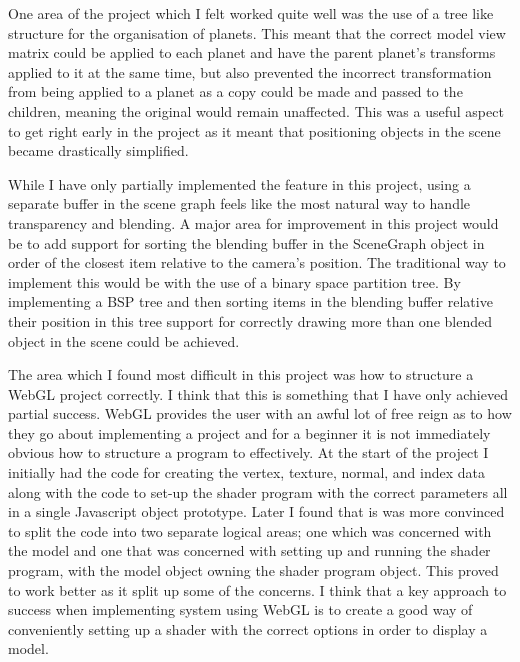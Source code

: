\documentclass[paper=a4, fontsize=11pt]{scrartcl}	%
\numberwithin{equation}{section}															%
\numberwithin{figure}{section}																%
\numberwithin{table}{section}																%
\begin{document}
One area of the project which I felt worked quite well was the use of a tree like structure for the organisation of planets. This meant that the correct model view matrix could be applied to each planet and have the parent planet's transforms applied to it at the same time, but also prevented the incorrect transformation from being applied to a planet as a copy could be made and passed to the children, meaning the original would remain unaffected. This was a useful aspect to get right early in the project as it meant that positioning objects in the scene became drastically simplified.

While I have only partially implemented the feature in this project, using a separate buffer in the scene graph feels like the most natural way to handle transparency and blending. A major area for improvement in this project would be to add support for sorting the blending buffer in the SceneGraph object in order of the closest item relative to the camera's position. The traditional way to implement this would be with the use of a binary space partition tree. By implementing a BSP tree and then sorting items in the blending buffer relative their position in this tree support for correctly drawing more than one blended object in the scene could be achieved.

The area which I found most difficult in this project was how to structure a WebGL project correctly. I think that this is something that I have only achieved partial success. WebGL provides the user with an awful lot of free reign as to how they go about implementing a project and for a beginner it is not immediately obvious how to structure a program to effectively. At the start of the project I initially had the code for creating the vertex, texture, normal, and index data along with the code to set-up the shader program with the correct parameters all in a single Javascript object prototype. Later I found that is was more convinced to split the code into two separate logical areas; one which was concerned with the model and one that was concerned with setting up and running the shader program, with the model object owning the shader program object. This proved to work better as it split up some of the concerns. I think that a key approach to success when implementing system using WebGL is to create a good way of conveniently setting up a shader with the correct options in order to display a model.
\end{document}
